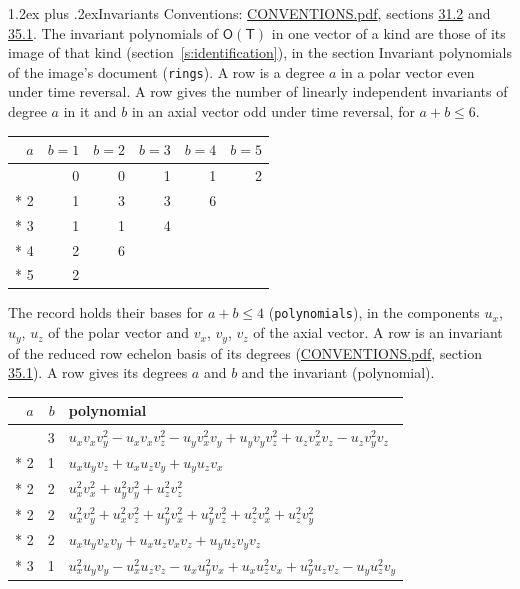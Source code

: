 \documentclass[10pt,a4paper]{article}
\makeatletter
\renewcommand\section{\@startsection{section}{1}{\z@}{-3ex plus -1ex minus -.2ex}%
  {1.2ex plus .2ex}{\normalfont\large\sffamily\bfseries\color{parttitle}}}
\numberwithin{equation}{section}
\newcommand{\grp}[1]{\mathsf{#1}}
\makeatother
\begin{document}
\section{Invariants}\label{s:invariants}
Conventions: \href{../../CONVENTIONS.pdf}{CONVENTIONS.pdf}, sections \href{../../CONVENTIONS.pdf\#conv.31.2}{31.2} and \href{../../CONVENTIONS.pdf\#conv.35.1}{35.1}.
The invariant polynomials of $\grp{O}(\grp{T})$ in one vector of a kind are those of its image of that kind (section~\ref{s:identification}), in the section Invariant polynomials of the image's document (\texttt{rings}).
\leavevmode\label{n:index.degree.polar}\label{n:index.degree.axial}A row is a degree $a$ in a polar vector even under time reversal. A row gives the number of linearly independent invariants of degree $a$ in it and $b$ in an axial vector odd under time reversal, for $a + b \le 6$.
{\small\begin{longtable}{@{}rrrrrr@{}}\toprule
$a$ & $b = 1$ & $b = 2$ & $b = 3$ & $b = 4$ & $b = 5$\\\midrule\endhead
\bottomrule\endfoot\endlastfoot
1 & 0 & 0 & 1 & 1 & 2\\*
2 & 1 & 3 & 3 & 6 & \\*
3 & 1 & 1 & 4 &  & \\*
4 & 2 & 6 &  &  & \\*
5 & 2 &  &  &  & \\
\bottomrule\end{longtable}}
\leavevmode\label{n:local.component.polar}\label{n:local.component.axial}The record holds their bases for $a + b \le 4$ (\texttt{polynomials}), in the components $u_{x}$, $u_{y}$, $u_{z}$ of the polar vector and $v_{x}$, $v_{y}$, $v_{z}$ of the axial vector. \label{n:head.polynomial}A row is an invariant of the reduced row echelon basis of its degrees (\href{../../CONVENTIONS.pdf}{CONVENTIONS.pdf}, section \href{../../CONVENTIONS.pdf\#conv.35.1}{35.1}). A row gives its degrees $a$ and $b$ and the invariant (polynomial).
{\small\renewcommand{\arraystretch}{1.2}\begin{longtable}{@{}rrl@{}}\toprule
$a$ & $b$ & polynomial\\\midrule\endhead
\bottomrule\endfoot\endlastfoot
1 & 3 & $u_{x}v_{x}v_{y}^{2} - u_{x}v_{x}v_{z}^{2} - u_{y}v_{x}^{2}v_{y} + u_{y}v_{y}v_{z}^{2} + u_{z}v_{x}^{2}v_{z} - u_{z}v_{y}^{2}v_{z}$\\*
2 & 1 & $u_{x}u_{y}v_{z} + u_{x}u_{z}v_{y} + u_{y}u_{z}v_{x}$\\*
2 & 2 & $u_{x}^{2}v_{x}^{2} + u_{y}^{2}v_{y}^{2} + u_{z}^{2}v_{z}^{2}$\\*
2 & 2 & $u_{x}^{2}v_{y}^{2} + u_{x}^{2}v_{z}^{2} + u_{y}^{2}v_{x}^{2} + u_{y}^{2}v_{z}^{2} + u_{z}^{2}v_{x}^{2} + u_{z}^{2}v_{y}^{2}$\\*
2 & 2 & $u_{x}u_{y}v_{x}v_{y} + u_{x}u_{z}v_{x}v_{z} + u_{y}u_{z}v_{y}v_{z}$\\*
3 & 1 & $u_{x}^{2}u_{y}v_{y} - u_{x}^{2}u_{z}v_{z} - u_{x}u_{y}^{2}v_{x} + u_{x}u_{z}^{2}v_{x} + u_{y}^{2}u_{z}v_{z} - u_{y}u_{z}^{2}v_{y}$\\
\bottomrule\end{longtable}}
\end{document}
